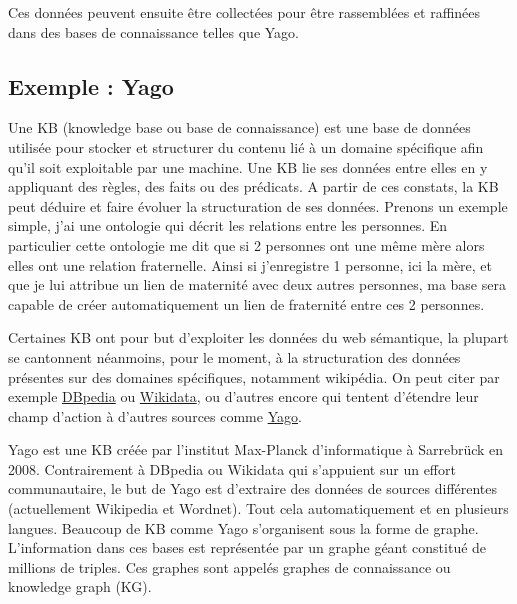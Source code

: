 Ces données peuvent ensuite être collectées pour être rassemblées et raffinées dans des bases de connaissance telles que Yago.

\subsection{Exemple : Yago}

Une KB (knowledge base ou base de connaissance) est une base de données utilisée pour stocker et structurer du contenu lié à un domaine spécifique afin qu'il soit exploitable par une machine. Une KB lie ses données entre elles en y appliquant des règles, des faits ou des prédicats. A partir de ces constats, la KB peut déduire et faire évoluer la structuration de ses données. Prenons un exemple simple, j'ai une ontologie qui décrit les relations entre les personnes. En particulier cette ontologie me dit que si 2 personnes ont une même mère alors elles ont une relation fraternelle. Ainsi si j'enregistre 1 personne, ici la mère, et que je lui attribue un lien de maternité avec deux autres personnes, ma base sera capable de créer automatiquement un lien de fraternité entre ces 2 personnes.

Certaines KB ont pour but d'exploiter les données du web sémantique, la plupart se cantonnent néanmoins, pour le moment, à la structuration des données présentes sur des domaines spécifiques, notamment wikipédia. On peut citer par exemple \href{http://wiki.dbpedia.org/about}{DBpedia} ou \href{https://www.wikidata.org/wiki/Wikidata:Main_Page}{Wikidata}, ou d'autres encore qui tentent d'étendre leur champ d'action à d'autres sources comme \href{http://www.mpi-inf.mpg.de/departments/databases-and-information-systems/research/yago-naga/yago/}{Yago}.

Yago est une KB créée par l'institut Max-Planck d'informatique à Sarrebrück en 2008. Contrairement à DBpedia ou Wikidata qui s'appuient sur un effort communautaire, le but de Yago est d'extraire des données de sources différentes (actuellement Wikipedia et Wordnet). Tout cela automatiquement et en plusieurs langues. Beaucoup de KB comme Yago s'organisent sous la forme de graphe. L'information dans ces bases est représentée par un graphe géant constitué de millions de triples. Ces graphes sont appelés graphes de connaissance ou knowledge graph (KG).

